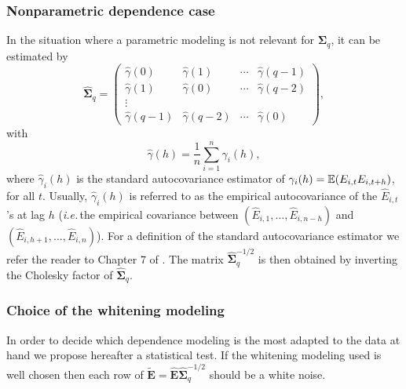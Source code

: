 \subsubsection{Nonparametric dependence case}\label{subsec:nonparam}

In the situation where a parametric modeling is not relevant for
$\boldsymbol{\Sigma}_q$, it can be estimated by
\begin{equation}
\widehat{\boldsymbol{\Sigma}}_q=\left(
\begin{matrix}
\widehat{\gamma}(0) & \widehat{\gamma}(1) & \cdots & \widehat{\gamma}(q-1)\\
\widehat{\gamma}(1) & \widehat{\gamma}(0) & \cdots & \widehat{\gamma}(q-2)\\
\vdots & & & \\
\widehat{\gamma}(q-1) & \widehat{\gamma}(q-2) & \cdots & \widehat{\gamma}(0)
\end{matrix}
\right),
\end{equation}
with
$$
\widehat{\gamma}(h)=\frac1n\sum_{i=1}^n \widehat{\gamma}_{i}(h),
$$
where $\widehat{\gamma}_{i}(h)$ is the standard autocovariance
estimator of $\gamma_i(h)=\mathbb{E}(E_{i,t}E_{i,t+h})$, for all $t$. Usually, $\widehat{\gamma}_{i}(h)$ is 
referred to as the empirical autocovariance of the
$\widehat{E}_{i,t}$'s at lag $h$  (\textit{i.e.}\,the
  empirical covariance between 
$(\widehat{E}_{i,1}, \dots ,\widehat{E}_{i,n-h})$ and $(\widehat{E}_{i,h+1}, \dots ,\widehat{E}_{i,n})$).
For a definition of the standard autocovariance estimator we
refer the reader to Chapter 7 of \cite{brockwell:davis}.
The matrix $\widehat{\boldsymbol{\Sigma}}_q^{-1/2}$ is then obtained by inverting the Cholesky factor of $\widehat{\boldsymbol{\Sigma}}_q$.


\subsubsection{Choice of the whitening modeling}\label{sec:whitening_test}

In order to decide which dependence modeling is the most adapted to
the data at hand we propose hereafter a statistical test.
If the whitening modeling used is well chosen then each row of 
$\widetilde{\boldsymbol{E}}=\widehat{\boldsymbol{E}}\widehat{\boldsymbol{\Sigma}}_q^{-1/2}$
should be a white noise. 

